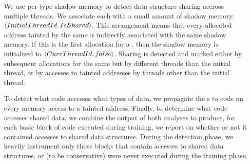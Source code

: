 \documentclass[letterpaper,twocolumn,10pt]{article}
\newcommand{\TextToolname}{Malcontent}
\newcommand{\Toolname}{\textsc{\TextToolname{}}}
\begin{document}
We use per-type shadow memory to detect data structure sharing accross multiple threads.
We associate each \TypeId{} with a small amount of shadow memory: $\langle InitialThreadId,\linebreak[0]IsShared \rangle$. This
arrangement means that every allocated address tainted by the same \TypeId{} is indirectly associated with the same
shadow memory. If this is the first allocation for a \TypeId, then the shadow memory is initialized to
$\langle CurrThreadId,\linebreak[0]false \rangle$. Sharing is detected and marked either by subsequent allocations for the
same \TypeId{} but by different threads than the initial thread, or by accesses to tainted addresses by threads other
than the initial thread.

To detect what code accesses what types of data, we propagate the {\TypeId}s to code on every memory access to
a tainted address. Finally, to determine what code accesses shared data, we combine the output of both analyses to
produce, for each basic block of code executed during training, we report on whether or not it contained accesses
to shared data structures. During the detection phase, we heavily instrument only those blocks that contain accesses
to shared data structures, or (to be conservative) were never executed during the training phase.

%
%
\end{document}
